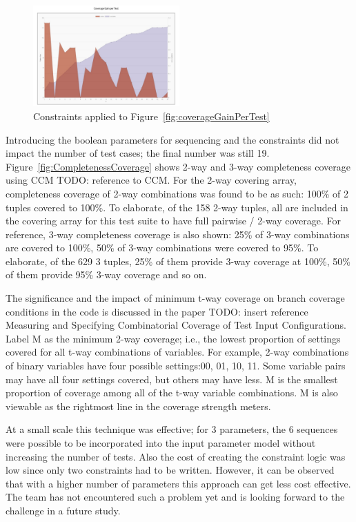 \documentclass[conference]{IEEEtran}
\newcommand{\todo}[1]{}
\renewcommand{\todo}[1]{{\color{red} TODO: {#1}}}
\begin{document}
	\begin{figure}[!h]
		\includegraphics[width=0.50\textwidth,]{coverageGainPerTest_withConstraints.pdf}
		\caption{Constraints applied to Figure~\ref{fig:coverageGainPerTest}}
		\label{fig:coverageGainPerTest_withConstraints}
	\end{figure}

	Introducing the boolean parameters for sequencing and the constraints did not impact the number of test cases; the final number was still 19.
	Figure~\ref{fig:CompletenessCoverage} shows 2-way and 3-way completeness coverage using CCM \todo{reference to CCM}. 
	For the 2-way covering array, completeness coverage of 2-way combinations was found to be as such: 100\% of 2 tuples covered to 100\%. 
	To elaborate, of the 158 2-way tuples, all are included in the covering array for this test suite to have full pairwise / 2-way coverage.
	For reference, 3-way completeness coverage is also shown: 25\% of 3-way combinations are covered to 100\%, 50\% of 3-way combinations were covered to 95\%.
	To elaborate, of the 629 3 tuples, 25\% of them provide 3-way coverage at 100\%, 50\% of them provide 95\% 3-way coverage and so on.

	The significance and the impact of minimum t-way coverage on branch coverage conditions in the code is discussed in the paper \todo{insert reference} Measuring and Specifying Combinatorial Coverage of Test Input Configurations.
	Label M as the minimum 2-way coverage; i.e., the lowest proportion of settings covered for all t-way combinations of variables.
	For example, 2-way combinations of binary variables have four possible settings:00, 01, 10, 11.
	Some variable pairs may have all four settings covered, but others may have less.
	M is the smallest proportion of coverage among all of the t-way variable combinations.
	M is also viewable as the rightmost line in the coverage strength meters.

	At a small scale this technique was effective; for 3 parameters, the 6 sequences were possible to be incorporated into the input parameter model without increasing the number of tests. 
	Also the cost of creating the constraint logic was low since only two constraints had to be written.
	However, it can be observed that with a higher number of parameters this approach can get less cost effective. 
	The team has not encountered such a problem yet and is looking forward to the challenge in a future study.
	
\end{document}
